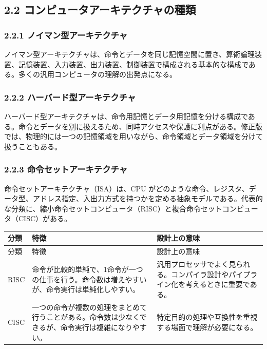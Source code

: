 \documentclass[a4paper,11pt]{ltjsarticle}
\begin{document}
\subsection{2.2 コンピュータアーキテクチャの種類}

\subsubsection{2.2.1 ノイマン型アーキテクチャ}

ノイマン型アーキテクチャは、命令とデータを同じ記憶空間に置き、算術論理装置、記憶装置、入力装置、出力装置、制御装置で構成される基本的な構成である。多くの汎用コンピュータの理解の出発点になる。

\subsubsection{2.2.2 ハーバード型アーキテクチャ}

ハーバード型アーキテクチャは、命令用記憶とデータ用記憶を分ける構成である。命令とデータを別に扱えるため、同時アクセスや保護に利点がある。修正版では、物理的には一つの記憶領域を用いながら、命令領域とデータ領域を分けて扱うこともある。

\subsubsection{2.2.3 命令セットアーキテクチャ}

命令セットアーキテクチャ（ISA）は、CPU がどのような命令、レジスタ、データ型、アドレス指定、入出力方式を持つかを定める抽象モデルである。代表的な分類に、縮小命令セットコンピュータ（RISC）と複合命令セットコンピュータ（CISC）がある。

\begin{longtable}{>{\raggedright\arraybackslash}p{}>{\raggedright\arraybackslash}p{}>{\raggedright\arraybackslash}p{}}
\toprule
分類 & 特徴 & 設計上の意味 \\
\midrule
\endfirsthead
\toprule
分類 & 特徴 & 設計上の意味 \\
\midrule
\endhead
RISC & 命令が比較的単純で、1命令が一つの仕事を行う。命令数は増えやすいが、命令実行は単純化しやすい。 & 汎用プロセッサでよく見られる。コンパイラ設計やパイプライン化を考えるときに重要である。 \\
CISC & 一つの命令が複数の処理をまとめて行うことがある。命令数は少なくできるが、命令実行は複雑になりやすい。 & 特定目的の処理や互換性を重視する場面で理解が必要になる。 \\
\bottomrule
\end{longtable}
\end{document}
